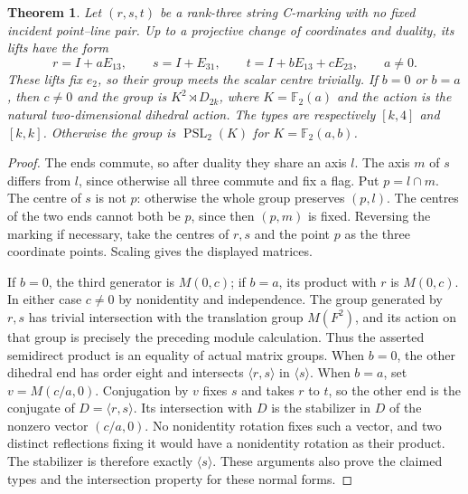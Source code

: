 \documentclass[11pt]{article}
\newtheorem{theorem}{Theorem}
\newcommand{\F}{\mathbb F}
\newcommand{\PSL}{\operatorname{PSL}}
\begin{document}
\begin{theorem}\label{three}
Let $(r,s,t)$ be a rank-three string C-marking with no fixed incident
point--line pair. Up to a projective change of coordinates and duality,
its lifts have the form
\[
 r=I+aE_{13},\qquad s=I+E_{31},\qquad
 t=I+bE_{13}+cE_{23},\qquad a\ne0.
\]
These lifts fix $e_2$, so their group meets the scalar centre trivially.
If $b=0$ or $b=a$, then $c\ne0$ and the group is
$K^2\rtimes D_{2k}$, where $K=\F_2(a)$ and the action is the natural
two-dimensional dihedral action. The types are respectively $[k,4]$
and $[k,k]$. Otherwise the group is $\PSL_2(K)$ for
$K=\F_2(a,b)$.
\end{theorem}
\begin{proof}
The ends commute, so after duality they share an axis $l$. The axis $m$
of $s$ differs from $l$, since otherwise all three commute and fix a
flag. Put $p=l\cap m$. The centre of $s$ is not $p$: otherwise the
whole group preserves $(p,l)$. The centres of the two ends cannot both
be $p$, since then $(p,m)$ is fixed. Reversing the marking if necessary,
take the centres of $r,s$ and the point $p$ as the three coordinate
points. Scaling gives the displayed matrices.

If $b=0$, the third generator is $M(0,c)$; if $b=a$, its product with
$r$ is $M(0,c)$. In either case $c\ne0$ by nonidentity and independence.
The group generated by $r,s$ has trivial intersection with the translation
group $M(F^2)$, and its action on that group is precisely the preceding
module calculation. Thus the asserted semidirect product is an equality
of actual matrix groups. When $b=0$, the other dihedral end has order
eight and intersects $\langle r,s\rangle$ in $\langle s\rangle$.
When $b=a$, set $v=M(c/a,0)$. Conjugation by $v$ fixes $s$ and takes
$r$ to $t$, so the other end is the conjugate of $D=\langle r,s\rangle$.
Its intersection with $D$ is the stabilizer in $D$ of the nonzero vector
$(c/a,0)$. No nonidentity rotation fixes such a vector, and two distinct
reflections fixing it would have a nonidentity rotation as their product.
The stabilizer is therefore exactly $\langle s\rangle$. These arguments
also prove the claimed types and the intersection property for these
normal forms.


\end{proof}
\end{document}
